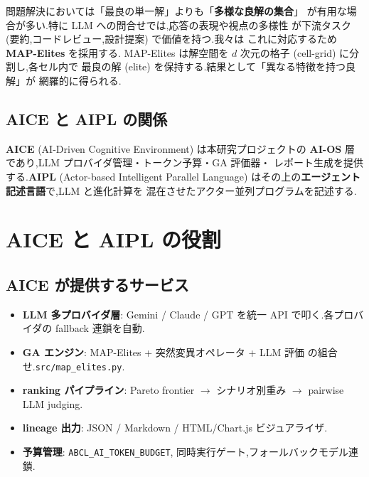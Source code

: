 \documentclass[11pt,a4paper]{article}
\newcommand{\code}[1]{\texttt{\small #1}}
\begin{document}
問題解決においては「最良の単一解」よりも「\textbf{多様な良解の集合}」
が有用な場合が多い.特に LLM への問合せでは,応答の表現や視点の多様性
が下流タスク (要約,コードレビュー,設計提案) で価値を持つ.我々は
これに対応するため \textbf{MAP-Elites} \cite{mouret2015mapelites} を採用する.
MAP-Elites は解空間を $d$ 次元の格子 (cell-grid) に分割し,各セル内で
最良の解 (elite) を保持する.結果として「異なる特徴を持つ良解」が
網羅的に得られる.

\subsection{AICE と AIPL の関係}

\textbf{AICE} (AI-Driven Cognitive Environment) は本研究プロジェクトの
\textbf{AI-OS} 層であり,LLM プロバイダ管理・トークン予算・GA 評価器・
レポート生成を提供する.\textbf{AIPL} (Actor-based Intelligent Parallel
Language) はその上の\textbf{エージェント記述言語}で,LLM と進化計算を
混在させたアクター並列プログラムを記述する.

\begin{center}
\end{center}

\section{AICE と AIPL の役割}
\label{sec:aice}

\subsection{AICE が提供するサービス}

\begin{itemize}[leftmargin=*,itemsep=0pt]
  \item \textbf{LLM 多プロバイダ層}: Gemini / Claude / GPT を統一 API
    で叩く.各プロバイダの fallback 連鎖を自動.
  \item \textbf{GA エンジン}: MAP-Elites + 突然変異オペレータ + LLM 評価
    の組合せ.\code{src/map\_elites.py}.
  \item \textbf{ranking パイプライン}: Pareto frontier $\to$
    シナリオ別重み $\to$ pairwise LLM judging.
  \item \textbf{lineage 出力}: JSON / Markdown / HTML/Chart.js
    ビジュアライザ.
  \item \textbf{予算管理}: \code{ABCL\_AI\_TOKEN\_BUDGET},
    同時実行ゲート,フォールバックモデル連鎖.
\end{itemize}
\end{document}
